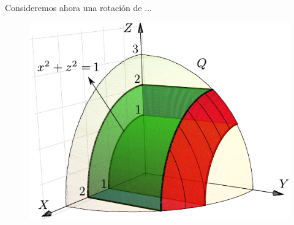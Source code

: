 \documentclass{article} %
\begin{document}
Consideremos ahora una rotación de ...
\begin{figure}[h!] %
	\centering %
	\includegraphics{images/figura4}
	\label{figura4}
\end{figure}
\end{document}
